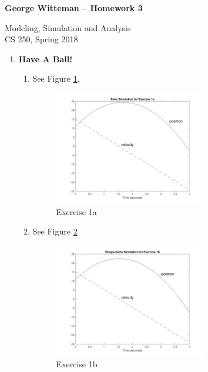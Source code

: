 \documentclass[12pt]{article}
\begin{document}
\begin{center}

\textbf{George Witteman -- Homework 3}

Modeling, Simulation and Analysis\\CS 250, Spring 2018

\end{center}

\begin{enumerate}
  \item \textbf{Have A Ball!}
  \begin{enumerate}
    \setcounter{enumii}{0}
    
  	\item
    	See Figure \ref{fig:1a-1}.
    	\begin{figure}[h!]
  			\includegraphics[width=0.666\textwidth]{1a-1}
  			\centering
        \caption{Exercise 1a}
        \label{fig:1a-1}
      \end{figure}
      
    \item
    	See Figure \ref{fig:1b-1}
    	\begin{figure}[h!]
  			\includegraphics[width=0.666\textwidth]{1b-1}
  			\centering
        \caption{Exercise 1b}
        \label{fig:1b-1}
      \end{figure}
      

\end{enumerate}
\end{enumerate}
\end{document}

